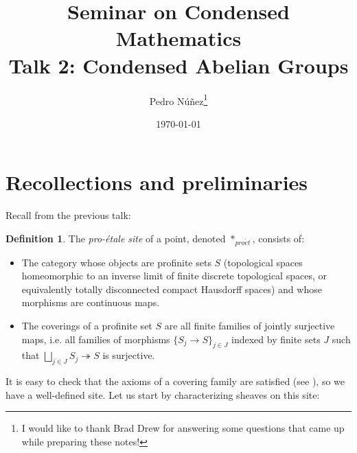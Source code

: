 \documentclass[11pt,A4]{article}
\title{Seminar on Condensed Mathematics \\ \large Talk 2: Condensed Abelian Groups}
\author{Pedro Núñez\thanks{I would like to thank Brad Drew for answering some questions that came up while preparing these notes!}}
\date{\today}
\theoremstyle{plain}
\theoremstyle{definition}
\newtheorem{defn}[thm]{Definition}
\theoremstyle{remark}
\newcommand{\1}{\mathbbm{1}}
\newcommand{\pe}{*_{pro\acute et}}
\begin{document}
\maketitle

\tableofcontents

\section{Recollections and preliminaries}

Recall from the previous talk:

\begin{defn}
    The \textit{pro-étale site} of a point, denoted $\pe$, consists of:
    \begin{itemize}
	\item The category whose objects are profinite sets $S$ (topological spaces homeomorphic to an inverse limit of finite discrete topological spaces, or equivalently totally disconnected compact Hausdorff spaces) and whose morphisms are continuous maps.
	\item The coverings of a profinite set $S$ are all finite families of jointly surjective maps, i.e. all families of morphisms $\{ S_{j}\to S\}_{j\in J}$ indexed by finite sets $J$ such that $\bigsqcup_{j\in J}S_{j}\twoheadrightarrow S$ is surjective.
    \end{itemize}
\end{defn}

It is easy to check that the axioms of a covering family are satisfied (see \cite[\href{https://stacks.math.columbia.edu/tag/00VH}{Tag 00VH}]{sta19}), so we have a well-defined site.
Let us start by characterizing sheaves on this site:
\end{document}
